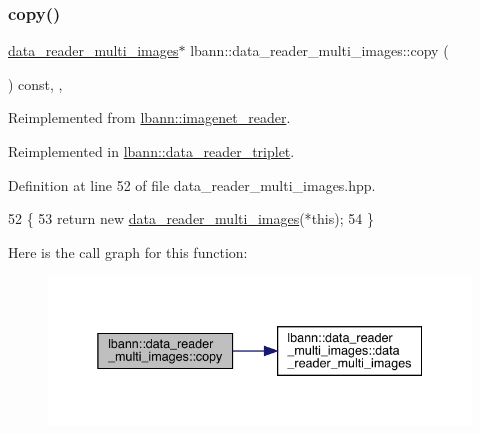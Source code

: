 \subsubsection{\texorpdfstring{copy()}{copy()}}
{\footnotesize\ttfamily \hyperlink{classlbann_1_1data__reader__multi__images}{data\+\_\+reader\+\_\+multi\+\_\+images}$\ast$ lbann\+::data\+\_\+reader\+\_\+multi\+\_\+images\+::copy (\begin{DoxyParamCaption}{ }\end{DoxyParamCaption}) const\hspace{0.3cm}{\ttfamily [inline]}, {\ttfamily [override]}, {\ttfamily [virtual]}}



Reimplemented from \hyperlink{classlbann_1_1imagenet__reader_a71be5220be24de5caf00d2e422b750f2}{lbann\+::imagenet\+\_\+reader}.



Reimplemented in \hyperlink{classlbann_1_1data__reader__triplet_aa390c4e801dfa367895ef0904daa0b77}{lbann\+::data\+\_\+reader\+\_\+triplet}.



Definition at line 52 of file data\+\_\+reader\+\_\+multi\+\_\+images.\+hpp.


\begin{DoxyCode}
52                                                   \{
53     \textcolor{keywordflow}{return} \textcolor{keyword}{new} \hyperlink{classlbann_1_1data__reader__multi__images_a91725ae909007b26410837257aa921dc}{data\_reader\_multi\_images}(*\textcolor{keyword}{this});
54   \}
\end{DoxyCode}
Here is the call graph for this function\+:\nopagebreak
\begin{figure}[H]
\begin{center}
\leavevmode
\includegraphics[width=338pt]{classlbann_1_1data__reader__multi__images_a46e1b7fab6ac5af4398cb9b5da900a74_cgraph}
\end{center}
\end{figure}
\mbox{\label{classlbann_1_1data__reader__multi__images_a713e4cc80a2d3a2b721d0912e3773baa}} 
